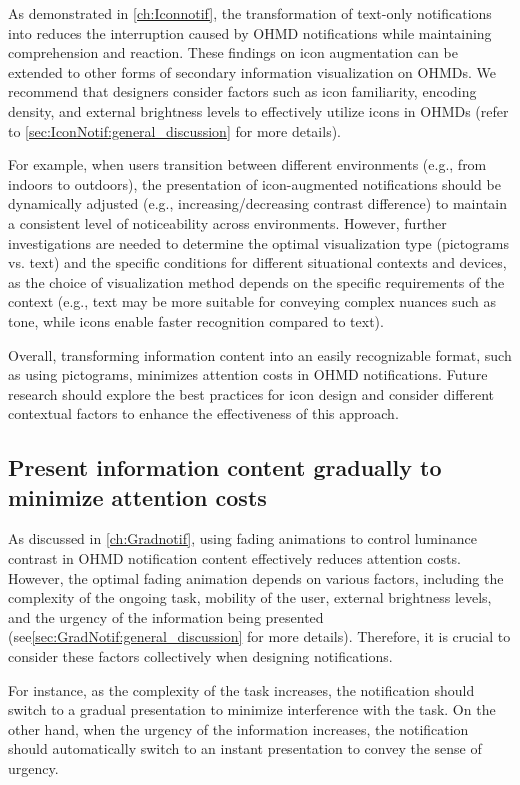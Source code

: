 As demonstrated in \autoref{ch:Iconnotif}, the transformation of text-only notifications into  reduces the interruption caused by OHMD notifications while maintaining comprehension and reaction. These findings on icon augmentation can be extended to other forms of secondary information visualization on OHMDs. We recommend that designers consider factors such as icon familiarity, encoding density, and external brightness levels to effectively utilize icons in OHMDs (refer to \autoref{sec:IconNotif:general_discussion} for more details).

For example, when users transition between different environments (e.g., from indoors to outdoors), the presentation of icon-augmented notifications should be dynamically adjusted (e.g., increasing/decreasing contrast difference) to maintain a consistent level of noticeability across environments. However, further investigations are needed to determine the optimal visualization type (pictograms vs. text) and the specific conditions for different situational contexts and devices, as the choice of visualization method depends on the specific requirements of the context (e.g., text may be more suitable for conveying complex nuances such as tone, while icons enable faster recognition compared to text).

Overall, transforming information content into an easily recognizable format, such as using pictograms, minimizes attention costs in OHMD notifications. Future research should explore the best practices for icon design and consider different contextual factors to enhance the effectiveness of this approach.

\subsection{Present information content gradually to minimize attention costs}

As discussed in \autoref{ch:Gradnotif}, using fading animations to control luminance contrast in OHMD notification content effectively reduces attention costs. However, the optimal fading animation depends on various factors, including the complexity of the ongoing task, mobility of the user, external brightness levels, and the urgency of the information being presented (see\autoref{sec:GradNotif:general_discussion} for more details). Therefore, it is crucial to consider these factors collectively when designing notifications.

For instance, as the complexity of the task increases, the notification should switch to a gradual presentation to minimize interference with the task. On the other hand, when the urgency of the information increases, the notification should automatically switch to an instant presentation to convey the sense of urgency.

